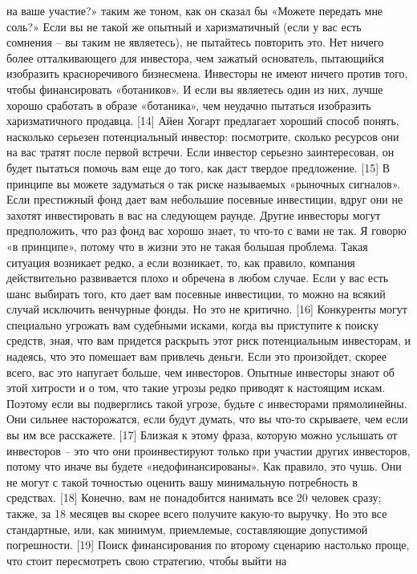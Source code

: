 \documentclass[ebook,12pt,oneside,openany]{memoir}
\begin{document}
на ваше участие?» таким же тоном, как он сказал бы «Можете передать
мне соль?» Если вы не такой же опытный и харизматичный (если у вас
есть сомнения – вы таким не являетесь), не пытайтесь повторить это.
Нет ничего более отталкивающего для инвестора, чем зажатый основатель,
пытающийся изобразить красноречивого бизнесмена. Инвесторы не имеют
ничего против того, чтобы финансировать «ботаников». И если вы
являетесь один из них, лучше хорошо сработать в образе «ботаника», чем
неудачно пытаться изобразить харизматичного продавца. [14] Айен Хогарт
предлагает хороший способ понять, насколько серьезен потенциальный
инвестор: посмотрите, сколько ресурсов они на вас тратят после первой
встречи. Если инвестор серьезно заинтересован, он будет пытаться
помочь вам еще до того, как даст твердое предложение. [15] В принципе
вы можете задуматься о так риске называемых «рыночных сигналов». Если
престижный фонд дает вам небольшие посевные инвестиции, вдруг они не
захотят инвестировать в вас на следующем раунде. Другие инвесторы
могут предположить, что раз фонд вас хорошо знает, то что-то с вами не
так. Я говорю «в принципе», потому что в жизни это не такая большая
проблема. Такая ситуация возникает редко, а если возникает, то, как
правило, компания действительно развивается плохо и обречена в любом
случае. Если у вас есть шанс выбирать того, кто дает вам посевные
инвестиции, то можно на всякий случай исключить венчурные фонды. Но
это не критично. [16] Конкуренты могут специально угрожать вам
судебными исками, когда вы приступите к поиску средств, зная, что вам
придется раскрыть этот риск потенциальным инвесторам, и надеясь, что
это помешает вам привлечь деньги. Если это произойдет, скорее всего,
вас это напугает больше, чем инвесторов. Опытные инвесторы знают об
этой хитрости и о том, что такие угрозы редко приводят к настоящим
искам. Поэтому если вы подверглись такой угрозе, будьте с инвесторами
прямолинейны. Они сильнее насторожатся, если будут думать, что вы
что-то скрываете, чем если вы им все расскажете. [17] Близкая к этому
фраза, которую можно услышать от инвесторов – это что они
проинвестируют только при участии других инвесторов, потому что иначе
вы будете «недофинансированы». Как правило, это чушь. Они не могут с
такой точностью оценить вашу минимальную потребность в средствах. [18]
Конечно, вам не понадобится нанимать все 20 человек сразу; также, за
18 месяцев вы скорее всего получите какую-то выручку. Но это все
стандартные, или, как минимум, приемлемые, составляющие допустимой
погрешности. [19] Поиск финансирования по второму сценарию настолько
проще, что стоит пересмотреть свою стратегию, чтобы выйти на
\end{document}

